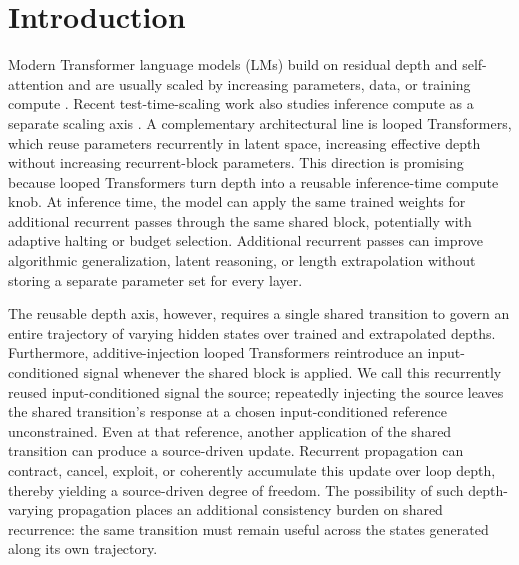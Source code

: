 \documentclass[letterpaper]{article} %
\theoremstyle{remark}
\begin{document}
\section{Introduction}
Modern Transformer language models (LMs) build on residual depth and self-attention \citep{he2016deep,vaswani2017attention} and are usually scaled by increasing parameters, data, or training compute \citep{kaplan2020scaling,hoffmann2022training}.  Recent test-time-scaling work also studies inference compute as a separate scaling axis \citep{snell2024scaling}.  A complementary architectural line is looped Transformers, which reuse parameters recurrently in latent space, increasing effective depth without increasing recurrent-block parameters.  This direction is promising because looped Transformers turn depth into a reusable inference-time compute knob.  At inference time, the model can apply the same trained weights for additional recurrent passes through the same shared block, potentially with adaptive halting or budget selection.  Additional recurrent passes can improve algorithmic generalization, latent reasoning, or length extrapolation without storing a separate parameter set for every layer.

The reusable depth axis, however, requires a single shared transition to govern an entire trajectory of varying hidden states over trained and extrapolated depths.  Furthermore, additive-injection looped Transformers reintroduce an input-conditioned signal whenever the shared block is applied.  We call this recurrently reused input-conditioned signal the source; repeatedly injecting the source leaves the shared transition's response at a chosen input-conditioned reference unconstrained.  Even at that reference, another application of the shared transition can produce a source-driven update.  Recurrent propagation can contract, cancel, exploit, or coherently accumulate this update over loop depth, thereby yielding a source-driven degree of freedom.  The possibility of such depth-varying propagation places an additional consistency burden on shared recurrence: the same transition must remain useful across the states generated along its own trajectory.
\end{document}

